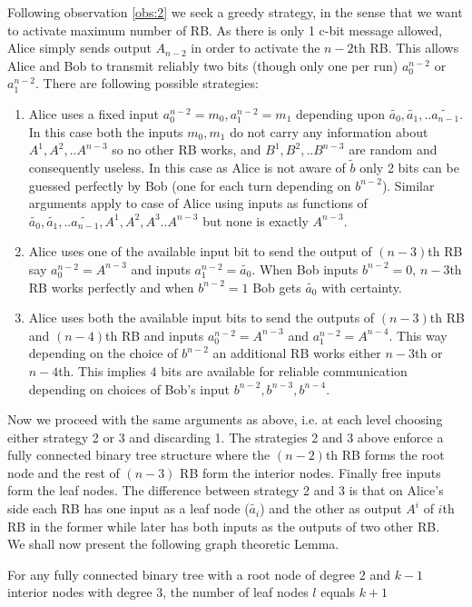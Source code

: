 Following observation \ref{obs:2} we seek a greedy strategy, in the sense that we want to activate maximum number of RB. As there is only 1 c-bit message allowed, Alice simply sends output $A_{n-2}$ in order to activate the $n-2$th RB. This allows Alice and Bob to transmit reliably two bits (though only one per run) $a_0^{n-2}$ or $a_1^{n-2}$. There are following possible strategies:
\begin{enumerate}
\item Alice uses a fixed input $a_0^{n-2}=m_0,a_1^{n-2}=m_1$ depending upon $\tilde{a_0},\tilde{a_1},..\tilde{a_{n-1}}$. In this case both the inputs $m_0,m_1$ do not carry any information about $A^1,A^2,..A^{n-3}$ so no other RB works, and $B^1,B^2,..B^{n-3}$ are random and consequently useless.  In this case as Alice is not aware of $\tilde{b}$ only 2 bits can be guessed perfectly by Bob (one for each turn depending on $b^{n-2}$). Similar arguments apply to case of Alice using inputs as functions of $\tilde{a_0},\tilde{a_1},..\tilde{a_{n-1}},A^{1},A^{2},A^{3}..A^{n-3}$ but none is exactly $A^{n-3}$.
\item Alice uses one of the available input bit to send the output of $(n-3)$th RB say $a_0^{n-2}=A^{n-3}$ and inputs $a_1^{n-2}=\tilde{a_0}$. When Bob inputs $b^{n-2}=0$, $n-3$th RB works perfectly and when $b^{n-2}=1$ Bob gets $\tilde{a_0}$ with certainty.
\item Alice uses both the available input bits to send the outputs of $(n-3)$th RB and $(n-4)$th RB and inputs $a_0^{n-2}=A^{n-3}$ and $a_1^{n-2}=A^{n-4}$. This way depending on the choice of $b^{n-2}$ an additional RB works either $n-3$th or $n-4$th. This implies $4$ bits are available for reliable communication depending on choices of Bob's input $b^{n-2},b^{n-3},b^{n-4}$. 
\end{enumerate}
Now we proceed with the same arguments as above, i.e. at each level choosing either strategy 2 or 3 and discarding 1. The strategies 2 and 3 above enforce a fully connected binary tree structure where the $(n-2)$th RB forms the root node and the rest of $(n-3)$ RB form the interior nodes. Finally free inputs form the leaf nodes. The difference between strategy 2 and 3 is that on Alice's side each RB has one input as a leaf node ($\tilde{a_i}$) and the other as output $A^i$ of $i$th RB in the former while later has both inputs as the outputs of two other RB. \\ 
We shall now present the following graph theoretic Lemma.
\begin{mydef2}
For any fully connected binary tree with a root node of degree $2$ and $k-1$  interior nodes with degree $3$, the number of leaf nodes $l$ equals $k+1$
\end{mydef2} 
